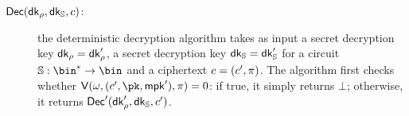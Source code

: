 \begin{construction}
\begin{description}
        \item[$\mathsf{Dec}(\mathsf{dk}_\rho, \mathsf{dk}_{\mathbb{S}}, c)$:] the deterministic decryption algorithm takes as input a secret decryption key $\mathsf{dk}_\rho = \mathsf{dk}'_\rho$, a secret decryption key $\mathsf{dk}_{\mathbb{S}} = \mathsf{dk}'_{\mathbb{S}}$ for a circuit $\saccess: \bin^* \to \bin$ and a ciphertext $c = (c', \pi)$. The algorithm first checks whether $\verifier(\crs, (\cipher', \pk, \mpk'), \pi) = 0$: if true, it simply returns $\bot$; otherwise, it returns $\mathsf{Dec}'(\mathsf{dk}'_\rho, \mathsf{dk}_{\mathbb{S}}, c')$.
    \end{description}
\end{construction}